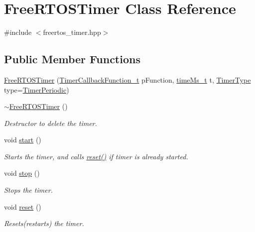 \hypertarget{classFreeRTOSTimer}{}\section{Free\+R\+T\+O\+S\+Timer Class Reference}
\label{classFreeRTOSTimer}


{\ttfamily \#include $<$freertos\+\_\+timer.\+hpp$>$}

\subsection*{Public Member Functions}
\begin{DoxyCompactItemize}
\item 
\hyperlink{classFreeRTOSTimer_a3f7e3569e552bac47dcb770d4a4a4ad0}{Free\+R\+T\+O\+S\+Timer} (\hyperlink{timers_8h_a5cf6d1f61ccd4871022ed8ad454c6027}{Timer\+Callback\+Function\+\_\+t} p\+Function, \hyperlink{freertos__timer_8hpp_a62332987634a9d461e934b53ee0e0772}{time\+Ms\+\_\+t} t, \hyperlink{freertos__timer_8hpp_ad3a7c38fbde9814e427a75171fe8939d}{Timer\+Type} type=\hyperlink{freertos__timer_8hpp_ad3a7c38fbde9814e427a75171fe8939dab782ae2f652b671e2a189f237bd4311b}{Timer\+Periodic})
\item 
\hyperlink{classFreeRTOSTimer_aa8a047ff6418d0d0d62716f47fd863c5}{$\sim$\+Free\+R\+T\+O\+S\+Timer} ()
\begin{DoxyCompactList}\small\item\em Destructor to delete the timer. \end{DoxyCompactList}\item 
void \hyperlink{classFreeRTOSTimer_a719e6350ecd4d41c1d2dbf8fe8ea140b}{start} ()
\begin{DoxyCompactList}\small\item\em Starts the timer, and calls \hyperlink{classFreeRTOSTimer_a86766a976a47b003a44d52a84bf734cc}{reset()} if timer is already started. \end{DoxyCompactList}\item 
void \hyperlink{classFreeRTOSTimer_a43992de1a6cc76749fd129b8b386b8e2}{stop} ()
\begin{DoxyCompactList}\small\item\em Stops the timer. \end{DoxyCompactList}\item 
void \hyperlink{classFreeRTOSTimer_a86766a976a47b003a44d52a84bf734cc}{reset} ()
\begin{DoxyCompactList}\small\item\em Resets(restarts) the timer. \end{DoxyCompactList}\item 

\end{DoxyCompactItemize}
